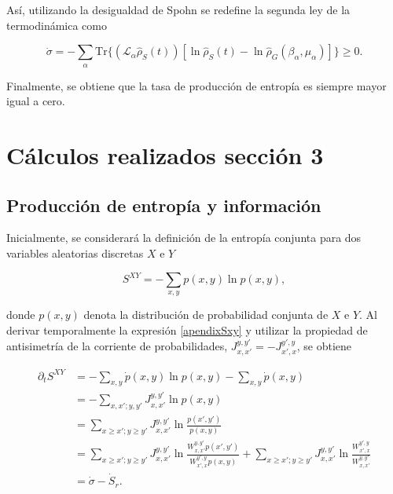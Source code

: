 \begin{appendixs}
Así, utilizando la desigualdad de Spohn se redefine la segunda ley de la termodinámica como

\begin{equation*}
    \dot{\sigma} = - \sum_{\alpha} \text{Tr}\{(\mathcal{L}_{\alpha}\hat{\rho}_{S}(t)) [\ln \hat{\rho}_{S}(t) -\ln \hat{\rho}_{G}(\beta_{\alpha},\mu_{\alpha}) ] \} \geq 0.
\end{equation*}

Finalmente, se obtiene que la tasa de producción de entropía es siempre mayor igual a cero.

\label{apendix:thermolaws}

\newpage 

    \section{Cálculos realizados sección 3}
    \subsection{Producción de entropía y información}
    Inicialmente, se considerará la definición de la entropía conjunta para dos variables aleatorias discretas \( X \) e \( Y \)

\begin{equation}
    S^{XY} = - \sum_{x,y} p(x,y) \ln p(x,y),
    \label{apendixSxy}
\end{equation}

donde \( p(x,y) \) denota la distribución de probabilidad conjunta de \( X \) e \( Y \). Al derivar temporalmente la expresión \ref{apendixSxy} y utilizar la propiedad de antisimetría de la corriente de probabilidades, \( J_{x,x'}^{y,y'} = - J_{x',x}^{y',y} \), se obtiene


    \begin{align*}
        \partial_{t}S^{XY} & = - \sum_{x,y} \dot{p}(x,y) \ln p(x,y) - \sum_{x,y} \dot{p}(x,y) \\
                           & = - \sum_{x,x';y,y'} J_{x,x'}^{y,y'} \ln p(x,y)  \\
                           & = \sum_{x \geq x'; y\geq y'} J_{x,x'}^{y,y'} \ln \frac{p(x',y')}{p(x,y)} \\
                           & = \sum_{x \geq x'; y\geq y'} J_{x,x'}^{y,y'} \ln \frac{W_{x,x'}^{y,y'} p(x',y')}{W_{x',x}^{y',y} p(x,y)} +  \sum_{x \geq x'; y\geq y'} J_{x,x'}^{y,y'} \ln \frac{W_{x',x}^{y',y} }{W_{x,x'}^{y,y'} } \\
                           & = \dot{\sigma} - \dot{S}_{r}.
    \end{align*}


\end{appendixs}
